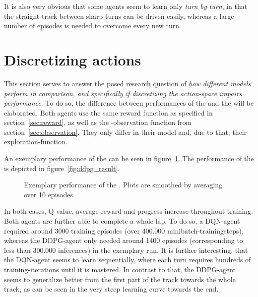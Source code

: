 It is also very obvious that some agents seem to learn only \textit{turn by turn}, in that the straight track between sharp turns can be driven easily, whereas a large number of episodes is needed to overcome every new turn.

\section{Discretizing actions}

This section serves to answer the posed research question of \textit{how different models perform in comparison, and specifically if discretizing the action-space impairs performance}. To do so, the difference between performances of the  and the  will be elaborated.
Both agents use the same reward function as specified in section~\ref{sec:reward}, as well as the -observation function from section~\ref{sec:observation}. They only differ in their model and, due to that, their exploration-function.

An exemplary performance of the  can be seen in figure~\ref{fig:dqn_result}. The performance of the  is depicted in figure~\ref{fig:ddpg_result}.

\begin{figure}[h!]
	{%
		\setlength{\fboxsep}{0pt}%
		\setlength{\fboxrule}{1pt}%
	}%
	\centering
	\caption[Exemplary performance of the ]{Exemplary performance of the . Plots are smoothed by averaging over 10 episodes.}
	\label{fig:dqn_result}
\end{figure}


In both cases, Q-value, average reward and progress increase throughout training. Both agents are further able to complete a whole lap. To do so, a DQN-agent required around 3000 training episodes (over 400.000 minibatch-trainingsteps), whereas the DDPG-agent only needed around 1400 episodes (corresponding to less than 300.000 inferences) in the exemplary run. It is further interesting, that the DQN-agent seems to learn sequentially, where each turn requires hundreds of training-iterations until it is mastered. In contrast to that, the DDPG-agent seems to generalize better from the first part of the track towards the whole track, as can be seen in the very steep learning curve towards the end.

